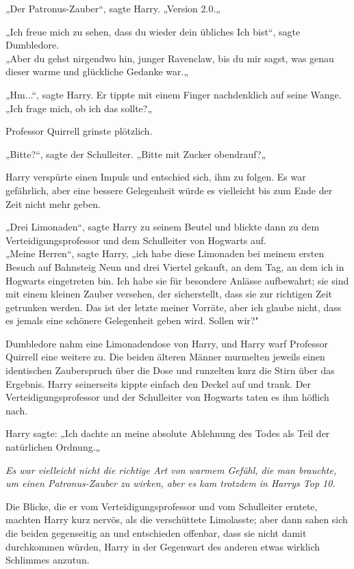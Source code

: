 {„Der Patronus-Zauber“, sagte Harry. „Version 2.0.„

„Ich freue mich zu sehen, dass du wieder dein übliches Ich bist“, sagte Dumbledore.\\ „Aber du gehst nirgendwo hin, junger Ravenclaw, bis du mir sagst, was genau dieser warme und glückliche Gedanke war.„

„Hm...“, sagte Harry. Er tippte mit einem Finger nachdenklich auf seine Wange.\\ „Ich frage mich, ob ich das sollte?„

Professor Quirrell grinste plötzlich.

„Bitte?“, sagte der Schulleiter. „Bitte mit Zucker obendrauf?„

Harry verspürte einen Impuls und entschied sich, ihm zu folgen. Es war gefährlich, aber eine bessere Gelegenheit würde es vielleicht bis zum Ende der Zeit nicht mehr geben.

„Drei Limonaden“, sagte Harry zu seinem Beutel und blickte dann zu dem Verteidigungsprofessor und dem Schulleiter von Hogwarts auf.\\ „Meine Herren“, sagte Harry, „ich habe diese Limonaden bei meinem ersten Besuch auf Bahnsteig Neun und drei Viertel gekauft, an dem Tag, an dem ich in Hogwarts eingetreten bin. Ich habe sie für besondere Anlässe aufbewahrt; sie sind mit einem kleinen Zauber versehen, der sicherstellt, dass sie zur richtigen Zeit getrunken werden. Das ist der letzte meiner Vorräte, aber ich glaube nicht, dass es jemals eine schönere Gelegenheit geben wird. Sollen wir?"

Dumbledore nahm eine Limonadendose von Harry, und Harry warf Professor Quirrell eine weitere zu. Die beiden älteren Männer murmelten jeweils einen identischen Zauberspruch über die Dose und runzelten kurz die Stirn über das Ergebnis. Harry seinerseits kippte einfach den Deckel auf und trank. Der Verteidigungsprofessor und der Schulleiter von Hogwarts taten es ihm höflich nach.

Harry sagte: „Ich dachte an meine absolute Ablehnung des Todes als Teil der natürlichen Ordnung.„

\emph{Es war vielleicht nicht die richtige Art von warmem Gefühl, die man brauchte, um einen Patronus-Zauber zu wirken, aber es kam trotzdem in Harrys Top 10.}

Die Blicke, die er vom Verteidigungsprofessor und vom Schulleiter erntete, machten Harry kurz nervös, als die verschüttete Limolasste; aber dann sahen sich die beiden gegenseitig an und entschieden offenbar, dass sie nicht damit durchkommen würden, Harry in der Gegenwart des anderen etwas wirklich Schlimmes anzutun.

}
